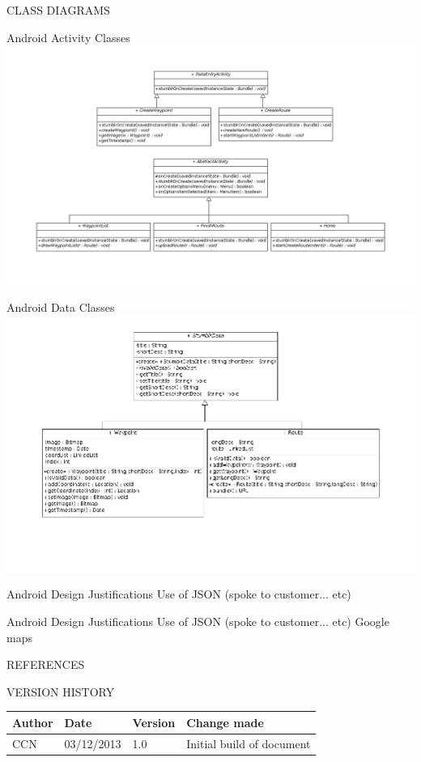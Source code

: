 \documentclass{article}
\newcommand{\versionhistory}{
		\begin{tabularx}{\linewidth}{| p{2cm} | p{2cm} | p{2cm} | X | }
			\hline
			\bf{Author} & \bf{Date} & \bf{Version} & \bf{Change made} \\
			\hline
			CCN & 03/12/2013 & 1.0 & Initial build of document \\
			\hline
		\end{tabularx}
}
\begin{document}
	
	\begin{section}{CLASS DIAGRAMS}
		\begin{subsection}{Android Activity Classes}
			\includegraphics[angle=270,width=0.75\columnwidth]{../ClassDiagrams/InterfaceClassDiagram.png}
		\end{subsection}
		
		\clearpage
		\begin{subsection}{Android Data Classes}
			\includegraphics[angle=270,width=0.8\columnwidth]{../ClassDiagrams/DataStructuresClassDiagram.png}
		\end{subsection}
	\end{section}
	
	\begin{section}{Android Design Justifications}
		Use of JSON (spoke to customer... etc)
	\end{section}
	
	\begin{section}{Android Design Justifications}
		Use of JSON (spoke to customer... etc)
		Google maps		
	\end{section}

	\nocite{LaTeXTemplate} %
	\nocite{LaTeXListings}
	\nocite{LaTeXListings2}
	\nocite{LaTeXListings3}

	\newpage
	\begin{section}{REFERENCES}
		
		
	\end{section}
	
	\vspace{1cm}
	\begin{section}{VERSION HISTORY}
		\versionhistory
	\end{section}
\end{document}
